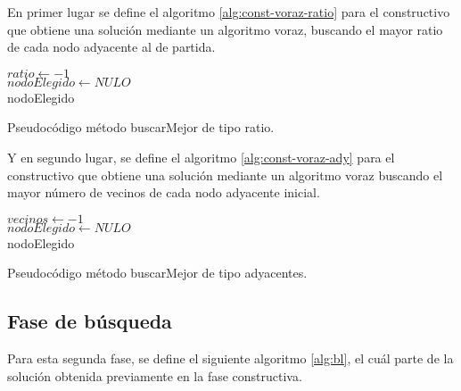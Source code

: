 \vspace{0.4cm}
En primer lugar se define el algoritmo \ref{alg:const-voraz-ratio} para el constructivo que obtiene una solución mediante un algoritmo voraz, buscando el mayor ratio de cada nodo adyacente al de partida.

\begin{algorithm}[H]
	$ ratio \gets -1 $ \\[0.2cm]
	$ nodoElegido \gets NULO $ \\[0.2cm]
	\Return nodoElegido
	\caption{Pseudocódigo método buscarMejor de tipo ratio.}
	\label{alg:const-voraz-ratio}
\end{algorithm}

\vspace{0.4cm}
Y en segundo lugar, se define el algoritmo \ref{alg:const-voraz-ady} para el constructivo que obtiene una solución mediante un algoritmo voraz buscando el mayor número de vecinos de cada nodo adyacente inicial.

\begin{algorithm}
	$ vecinos \gets -1 $ \\[0.2cm]
	$ nodoElegido \gets NULO $ \\[0.2cm]
	\Return nodoElegido
	\caption{Pseudocódigo método buscarMejor de tipo adyacentes.}
	\label{alg:const-voraz-ady}
\end{algorithm}

\subsection{Fase de búsqueda}
\label{sec:faseBusqueda}
Para esta segunda fase, se define el siguiente algoritmo \ref{alg:bl}, el cuál parte de la solución obtenida previamente en la fase constructiva.

